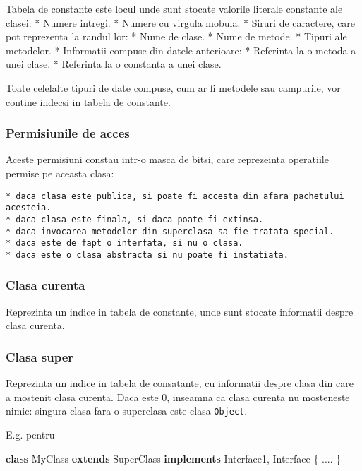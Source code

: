 \documentclass[]{article}
\newenvironment{Shaded}{}{}
\newcommand{\KeywordTok}[1]{\textcolor[rgb]{0.00,0.44,0.13}{\textbf{#1}}}
\newcommand{\NormalTok}[1]{#1}
\begin{document}
Tabela de constante este locul unde sunt stocate valorile literale
constante ale clasei: * Numere intregi. * Numere cu virgula mobula. *
Siruri de caractere, care pot reprezenta la randul lor: * Nume de clase.
* Nume de metode. * Tipuri ale metodelor. * Informatii compuse din
datele anterioare: * Referinta la o metoda a unei clase. * Referinta la
o constanta a unei clase.

Toate celelalte tipuri de date compuse, cum ar fi metodele sau
campurile, vor contine indecsi in tabela de constante.

\subsubsection{Permisiunile de acces}\label{permisiunile-de-acces}

Aceste permisiuni constau intr-o masca de bitsi, care reprezeinta
operatiile permise pe aceasta clasa:

\begin{verbatim}
* daca clasa este publica, si poate fi accesta din afara pachetului acesteia.
* daca clasa este finala, si daca poate fi extinsa.
* daca invocarea metodelor din superclasa sa fie tratata special.
* daca este de fapt o interfata, si nu o clasa.
* daca este o clasa abstracta si nu poate fi instatiata.
\end{verbatim}

\subsubsection{Clasa curenta}\label{clasa-curenta}

Reprezinta un indice in tabela de constante, unde sunt stocate
informatii despre clasa curenta.

\subsubsection{Clasa super}\label{clasa-super}

Reprezinta un indice in tabela de consatante, cu informatii despre clasa
din care a mostenit clasa curenta. Daca este 0, inseamna ca clasa
curenta nu mosteneste nimic: singura clasa fara o superclasa este clasa
\texttt{Object}.

E.g. pentru

\begin{Shaded}
\begin{Highlighting}[]
\KeywordTok{class}\NormalTok{ MyClass }\KeywordTok{extends}\NormalTok{ SuperClass }\KeywordTok{implements}\NormalTok{ Interface1, Interface \{}
\NormalTok{    ....}
\NormalTok{\}}
\end{Highlighting}
\end{Shaded}
\end{document}
